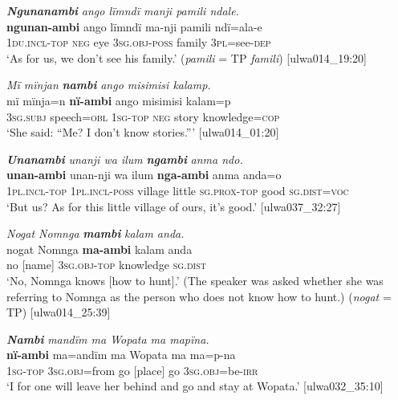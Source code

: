 \ea%
    \label{ex:pron:85}
          \textbf{\textit{Ngunanambi}} \textit{ango lïmndï manji pamili ndale.}\\
\gll \textbf{ngunan-ambi}  ango  lïmndï  ma-nji      pamili  ndï=ala-e\\
    1\textsc{du.incl-top}  \textsc{neg}  eye    3\textsc{sg.obj-poss}  family  3\textsc{pl}=see-\textsc{dep}\\
\glt `As for us, we don’t see his family.’ (\textit{pamili} = TP \textit{famili}) [ulwa014\_19:20]
\z

\ea%
    \label{ex:pron:86}
          \textit{Mï mïnjan} \textbf{\textit{nambi}} \textit{ango misimisi kalamp.}\\
\gll   mï      mïnja=n    \textbf{nï-ambi}  ango  misimisi kalam=p\\
    3\textsc{sg.subj}  speech=\textsc{obl}  1\textsc{sg-top}  \textsc{neg}  story    knowledge=\textsc{cop}\\
\glt `She said: “Me? I don’t know stories.”’ [ulwa014\_01:20]
\z

\ea%
    \label{ex:pron:87}
          \textbf{\textit{Unanambi}} \textit{unanji wa ilum} \textbf{\textit{ngambi}} \textit{anma ndo.}\\
\gll    \textbf{unan-ambi}  unan-nji     wa    ilum  \textbf{nga-ambi}    anma anda{}=o\\
    1\textsc{pl.incl-top}  \textsc{1pl.incl-poss}  village  little  \textsc{sg.prox-top}  good    \textsc{sg.dist=voc}\\
\glt `But us? As for this little village of ours, it’s good.’ [ulwa037\_32:27]
\z

\ea%
    \label{ex:pron:88}
          \textit{Nogat Nomnga} \textbf{\textit{mambi}} \textit{kalam anda.}\\
\gll    nogat  Nomnga  \textbf{ma-ambi}    kalam    anda\\
    no    [name]    3\textsc{sg.obj-top}  knowledge  \textsc{sg.dist}\\
\glt `No, Nomnga knows [how to hunt].’ (The speaker was asked whether she was referring to Nomnga as the person who does not know how to hunt.) (\textit{nogat} = TP) [ulwa014\_25:39]
\z

\ea%
    \label{ex:pron:89}
          \textbf{\textit{Nambi}} \textit{mandïm ma Wopata ma mapïna.}\\
\gll    \textbf{nï-ambi}  ma=andïm  ma    Wopata  ma  ma=p-na\\
    1\textsc{sg-top}  3\textsc{sg.obj=}from  go  [place]    go  3\textsc{sg.obj}=be-\textsc{irr}\\
\glt `I for one will leave her behind and go and stay at Wopata.’ [ulwa032\_35:10]
\z

